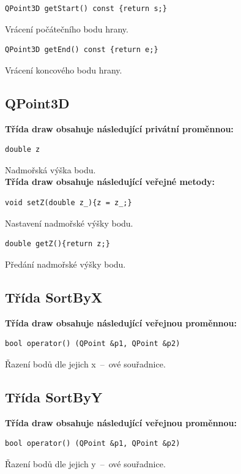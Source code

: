 \documentclass[a4paper, 12pt, oneside, titlepage]{article} %
\begin{document}
\begin{verbatim}
QPoint3D getStart() const {return s;}
\end{verbatim}
Vrácení počátečního bodu hrany.\\

\begin{verbatim}
QPoint3D getEnd() const {return e;}
\end{verbatim}
Vrácení koncového bodu hrany.\\

\subsection{QPoint3D}
\textbf{Třída draw obsahuje následující privátní proměnnou:}
\begin{verbatim}
double z
\end{verbatim}
Nadmořská výška bodu.\\

\textbf{Třída draw obsahuje následující veřejné metody:}
\begin{verbatim}
void setZ(double z_){z = z_;}
\end{verbatim}
Nastavení nadmořské výšky bodu.\\

\begin{verbatim}
double getZ(){return z;}
\end{verbatim}
Předání nadmořské výšky bodu.\\

\subsection{Třída SortByX}
\textbf{Třída draw obsahuje následující veřejnou proměnnou:}
\begin{verbatim}
bool operator() (QPoint &p1, QPoint &p2)
\end{verbatim}
Řazení bodů dle jejich x~--~ové souřadnice.\\

\subsection{Třída SortByY}
\textbf{Třída draw obsahuje následující veřejnou proměnnou:}
\begin{verbatim}
bool operator() (QPoint &p1, QPoint &p2)
\end{verbatim}
Řazení bodů dle jejich y~--~ové souřadnice.\\
\end{document}
